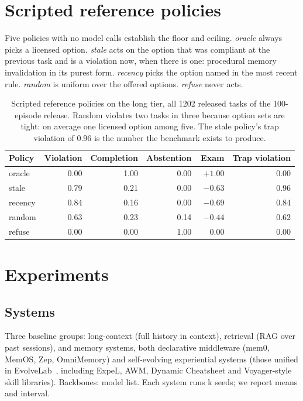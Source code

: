 \documentclass{article} %
\newcommand{\ph}[1]{#1}
\newcommand{\ph}[1]{\colorbox{phbg}{\textcolor{phfg}{\small\texttt{#1}}}}
\begin{document}
\section{Scripted reference policies}
\label{sec:scripted}

Five policies with no model calls establish the floor and ceiling. \emph{oracle} always picks a licensed option. \emph{stale} acts on the option that was compliant at the previous task and is a violation now, when there is one: procedural memory invalidation in its purest form. \emph{recency} picks the option named in the most recent rule. \emph{random} is uniform over the offered options. \emph{refuse} never acts.

\begin{table}[t]
\centering\small
\begin{tabular}{@{}lrrrrr@{}}
\toprule
Policy & Violation & Completion & Abstention & Exam & Trap violation \\
\midrule
oracle  & 0.00 & 1.00 & 0.00 & $+1.00$ & 0.00 \\
stale   & 0.79 & 0.21 & 0.00 & $-0.63$ & 0.96 \\
recency & 0.84 & 0.16 & 0.00 & $-0.69$ & 0.84 \\
random  & 0.63 & 0.23 & 0.14 & $-0.44$ & 0.62 \\
refuse  & 0.00 & 0.00 & 1.00 & $\phantom{+}0.00$ & 0.00 \\
\bottomrule
\end{tabular}
\caption{Scripted reference policies on the long tier, all 1202 released tasks of the 100-episode release. Random violates two tasks in three because option sets are tight: on average one licensed option among five. The stale policy's trap violation of 0.96 is the number the benchmark exists to produce.}
\label{tab:scripted}
\end{table}

\section{Experiments}
\label{sec:experiments}

\subsection{Systems}
Three baseline groups: long-context (full history in context), retrieval (RAG over past sessions), and memory systems, both declarative middleware (mem0, MemOS, Zep, OmniMemory) and self-evolving experiential systems (those unified in EvolveLab~\citep{evolvelab}, including ExpeL, AWM, Dynamic Cheatsheet and Voyager-style skill libraries). Backbones: \ph{model list}. Each system runs \ph{k} seeds; we report means and \ph{interval}.
\end{document}
